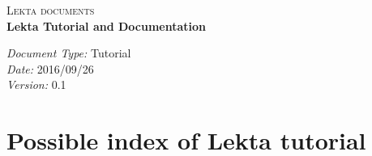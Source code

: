 \documentclass[a4paper,10pt]{article}
\begin{document}
\large
\begin{center}
\textsc{Lekta documents} \\

\LARGE
\vspace{24pt}
\textbf{Lekta Tutorial and Documentation}
\vspace{24pt}
\end{center}

\normalsize
\begin{flushleft}
\emph{Document Type:} Tutorial \\
\emph{Date:} 2016/09/26 \\
\emph{Version:} 0.1
\end{flushleft}

\vspace{24pt}
\section{Possible index of Lekta tutorial}
\end{document}

